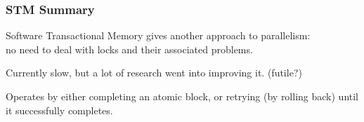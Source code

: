 \begin{frame}
  \frametitle{STM Summary}


     Software Transactional Memory gives another approach to
      parallelism: \\ \qquad no need to deal with locks and their associated problems.

     Currently slow, but a lot of research went into improving it. (futile?)

     Operates by either completing an atomic block, or retrying (by rolling
      back) until it successfully completes.

\end{frame}




